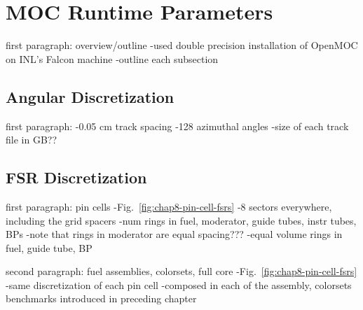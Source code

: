 \section{\ac{MOC} Runtime Parameters}
\label{sec:chap8-moc-params}

first paragraph: overview/outline
-used double precision installation of OpenMOC on INL's Falcon machine
-outline each subsection

\subsection{Angular Discretization}
\label{subsec:chap8-angular-discretizations}

first paragraph: 
-0.05 cm track spacing
-128 azimuthal angles
-size of each track file in GB??

\subsection{\ac{FSR} Discretization}
\label{subsec:chap8-fsr-discretizations}

first paragraph: pin cells
-Fig.~\ref{fig:chap8-pin-cell-fsrs}
-8 sectors everywhere, including the grid spacers
-num rings in fuel, moderator, guide tubes, instr tubes, BPs
-note that rings in moderator are equal spacing???
-equal volume rings in fuel, guide tube, BP

second paragraph: fuel assemblies, colorsets, full core
-Fig.~\ref{fig:chap8-pin-cell-fsrs}
-same discretization of each pin cell
-composed in each of the assembly, colorsets benchmarks introduced in preceding chapter



